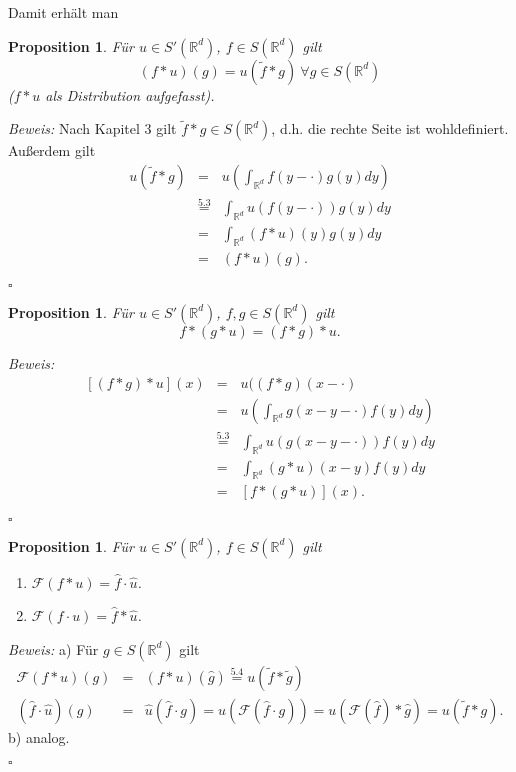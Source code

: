 \documentclass[12pt,a4paper,titlepage]{scrartcl}
\newtheorem{Prop}[Satz]{Proposition}
\numberwithin{equation}{section}
\newcommand{\R}{\mathbb{R}} %
\newcommand{\f}{\hat{f}}
\newcommand{\g}{\hat{g}}
\newcommand{\F}{\mathcal{F}}
\newcommand{\m}{\cdot}
\newcommand{\Bew}{\emph{Beweis: }}
\newcommand{\qed}{\begin{flushright}
		$\square$
	\end{flushright}}
\begin{document}
	Damit erhält man
	\begin{Prop}
		Für $u\in S'(\R^d)$, $f\in S(\R^d)$ gilt $$(f*u)(g) = u(\tilde{f}*g) ~\forall g\in S(\R^d)$$
		($f*u$ als Distribution aufgefasst).
	\end{Prop}
	
	\Bew Nach Kapitel 3 gilt $\tilde{f}*g\in S(\R^d)$, d.h. die rechte Seite ist wohldefiniert. Außerdem gilt
	\begin{eqnarray}
		u(\tilde{f}*g) &=& u\left(\int_{\R^d}f(y-\m)g(y) dy \right)\nonumber\\
		&\overset{\text{5.3}}{=} & \int_{\R^d} u(f(y-\m))g(y)dy\nonumber\\
		&=& \int_{\R^d}(f*u)(y) g(y) dy\nonumber\\
		&=& (f*u)(g)\nonumber.
	\end{eqnarray}
	\qed
	
	\begin{Prop}
		Für $u\in S'(\R^d)$, $f,g\in S(\R^d)$ gilt 
		$$f*(g*u)= (f*g)*u.$$
	\end{Prop}
	
	\Bew 
	\begin{eqnarray}
		\left[(f*g)*u \right](x) &=& u((f*g)(x-\m)\nonumber\\
		&=& u\left(\int_{\R^d} g(x-y-\m)f(y) dy \right) \nonumber\\
		&\overset{\text{5.3}}{=}& \int_{\R^d} u(g(x-y-\m))f(y) dy\nonumber\\
		&=& \int_{\R^d} (g*u)(x-y)f(y)dy\nonumber\\
		&=& [f*(g*u)](x)\nonumber.
	\end{eqnarray}
	\qed
	
	\begin{Prop}
		Für $u\in S'(\R^d)$, $f\in S(\R^d)$ gilt
		\begin{enumerate}
			\item[a)] $\F(f*u) = \f\m \hat{u}$.
			\item[b)] $\F(f\m u) = \f *\hat{u}$.
		\end{enumerate}
	\end{Prop}
	
	\Bew a) Für $g\in S(\R^d)$ gilt
	\begin{eqnarray}
		\F(f*u)(g) &=& (f*u)(\g) \overset{\text{5.4}}{=} u(\tilde{f}*\tilde{g})\nonumber\\
		(\f\m \hat{u})(g) &=& \hat{u}(\f\m g) = u(\F(\f\m g)) = u(\F(\f)*\g) = u(\tilde{f}* g). \nonumber
	\end{eqnarray}
	b) analog.
	\qed
	
\end{document}
